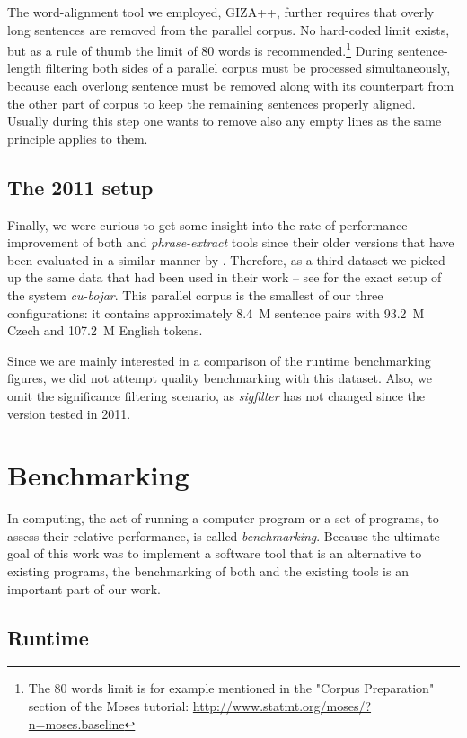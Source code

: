 The word-alignment tool we employed, GIZA++, further requires that overly long sentences are
removed from the parallel corpus.
No hard-coded limit exists, but as a rule of thumb the limit of 80 words is
recommended.\footnote{The 80 words limit is for example mentioned in the "Corpus Preparation"
section of the Moses tutorial: \url{http://www.statmt.org/moses/?n=moses.baseline}}
During sentence-length filtering both sides of a parallel corpus must be
processed simultaneously, because each overlong sentence must be removed along
with its counterpart from the other part of corpus to keep the remaining sentences
properly aligned.
Usually during this step one wants to remove also any empty lines as the same principle
applies to them.

\subsection{The 2011 setup}
Finally, we were curious to get some insight into the rate of performance improvement
of both \eppex{} and \emph{phrase-extract} tools since their older versions that have
been evaluated in a similar manner by \citet{przywara:eppex}.
Therefore, as a third dataset we picked up the same data that had been used in their
work -- see \citet{marecek:twostep} for the exact setup of the system \emph{cu-bojar}.
This parallel corpus is the smallest of our three configurations: it contains
approximately 8.4~M sentence pairs with 93.2~M Czech and 107.2~M English tokens.

Since we are mainly interested in a comparison of the runtime benchmarking figures,
we did not attempt quality benchmarking with this dataset.
Also, we omit the significance filtering scenario, as \emph{sigfilter} has not changed
since the version tested in 2011.

\section{Benchmarking}

In computing, the act of running a computer program or a set of programs, to assess their relative
performance, is called \emph{benchmarking}.
Because the ultimate goal of this work was to implement a software tool that is an alternative
to existing programs, the benchmarking of both \eppex{} and the existing tools is an important part of
our work.

\subsection{Runtime}
\label{sec:runtime-benchmarking}

